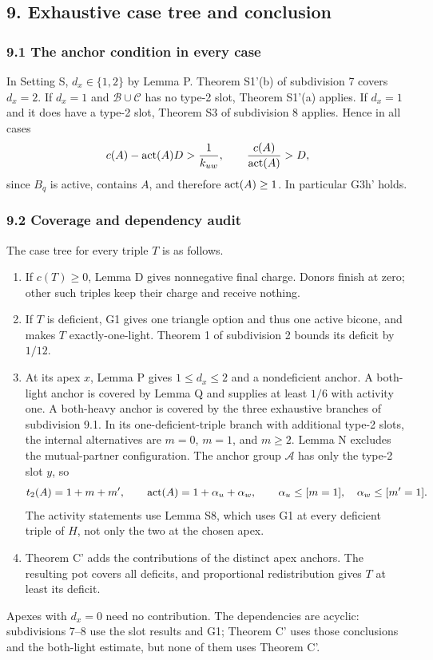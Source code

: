 \subsection*{9. Exhaustive case tree and conclusion}
\subsubsection*{9.1 The anchor condition in every case}
In Setting S, $d_x\in\{1,2\}$ by Lemma P. Theorem S1'(b) of subdivision 7 covers $d_x=2$. If $d_x=1$ and $\mathcal B\cup\mathcal C$ has no type-2 slot, Theorem S1'(a) applies. If $d_x=1$ and it does have a type-2 slot, Theorem S3 of subdivision 8 applies. Hence in all cases
\[
 c(A)-\operatorname{act}(A)D>\frac1{k_{uw}},\qquad \frac{c(A)}{\operatorname{act}(A)}>D,
\]
since $B_q$ is active, contains $A$, and therefore $\operatorname{act}(A)\geq1$. In particular G3h' holds.
\subsubsection*{9.2 Coverage and dependency audit}
The case tree for every triple $T$ is as follows.
\begin{enumerate}
\item If $c(T)\geq0$, Lemma D gives nonnegative final charge. Donors finish at zero; other such triples keep their charge and receive nothing.
\item If $T$ is deficient, G1 gives one triangle option and thus one active bicone, and makes $T$ exactly-one-light. Theorem 1 of subdivision 2 bounds its deficit by $1/12$.
\item At its apex $x$, Lemma P gives $1\leq d_x\leq2$ and a nondeficient anchor. A both-light anchor is covered by Lemma Q and supplies at least $1/6$ with activity one. A both-heavy anchor is covered by the three exhaustive branches of subdivision 9.1. In its one-deficient-triple branch with additional type-2 slots, the internal alternatives are $m=0$, $m=1$, and $m\geq2$. Lemma N excludes the mutual-partner configuration. The anchor group $\mathcal A$ has only the type-2 slot $y$, so
\[
 t_2(A)=1+m+m',\qquad \operatorname{act}(A)=1+\alpha_u+\alpha_w,\qquad
 \alpha_u\leq[m=1],\quad\alpha_w\leq[m'=1].
\]
The activity statements use Lemma S8, which uses G1 at every deficient triple of $H$, not only the two at the chosen apex.
\item Theorem C' adds the contributions of the distinct apex anchors. The resulting pot covers all deficits, and proportional redistribution gives $T$ at least its deficit.
\end{enumerate}
Apexes with $d_x=0$ need no contribution. The dependencies are acyclic: subdivisions 7--8 use the slot results and G1; Theorem C' uses those conclusions and the both-light estimate, but none of them uses Theorem C'.
